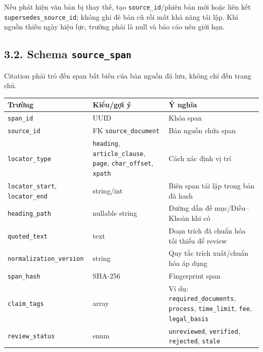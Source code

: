 \documentclass[11pt,a4paper]{article}
\begin{document}
Nếu phát hiện văn bản bị thay thế, tạo \nolinkurl{source_id}/phiên bản
mới hoặc liên kết \nolinkurl{supersedes_source_id}; không ghi đè bản cũ
rồi mất khả năng tái lập. Khi nguồn thiếu ngày hiệu lực, trường phải là
null và báo cáo nêu giới hạn.

\subsection{\texorpdfstring{3.2. Schema
\nolinkurl{source_span}}{3.2. Schema }}\label{schema-source_span}

Citation phải trỏ đến span bất biến của bản nguồn đã lưu, không chỉ đến
trang chủ.

{\def\LTcaptype{none} %
\begin{longtable}[]{@{}
  >{\raggedright\arraybackslash}p{}
  >{\raggedright\arraybackslash}p{}
  >{\raggedright\arraybackslash}p{}@{}}
\toprule\noalign{}
\begin{minipage}[b]{\linewidth}\raggedright
Trường
\end{minipage} & \begin{minipage}[b]{\linewidth}\raggedright
Kiểu/gợi ý
\end{minipage} & \begin{minipage}[b]{\linewidth}\raggedright
Ý nghĩa
\end{minipage} \\
\midrule\noalign{}
\endhead
\bottomrule\noalign{}
\endlastfoot
\nolinkurl{span_id} & UUID & Khóa span \\
\nolinkurl{source_id} & FK \nolinkurl{source_document} & Bản nguồn chứa
span \\
\nolinkurl{locator_type} & \nolinkurl{heading},
\nolinkurl{article_clause}, \nolinkurl{page}, \nolinkurl{char_offset},
\nolinkurl{xpath} & Cách xác định vị trí \\
\nolinkurl{locator_start}, \nolinkurl{locator_end} & string/int & Biên
span tái lập trong bản đã hash \\
\nolinkurl{heading_path} & nullable string & Đường dẫn đề
mục/Điều--Khoản khi có \\
\nolinkurl{quoted_text} & text & Đoạn trích đã chuẩn hóa tối thiểu để
review \\
\nolinkurl{normalization_version} & string & Quy tắc trích xuất/chuẩn
hóa áp dụng \\
\nolinkurl{span_hash} & SHA-256 & Fingerprint span \\
\nolinkurl{claim_tags} & array & Ví dụ: \nolinkurl{required_documents},
\nolinkurl{process}, \nolinkurl{time_limit}, \nolinkurl{fee},
\nolinkurl{legal_basis} \\
\nolinkurl{review_status} & enum & \nolinkurl{unreviewed},
\nolinkurl{verified}, \nolinkurl{rejected}, \nolinkurl{stale} \\
\end{longtable}
}
\end{document}
